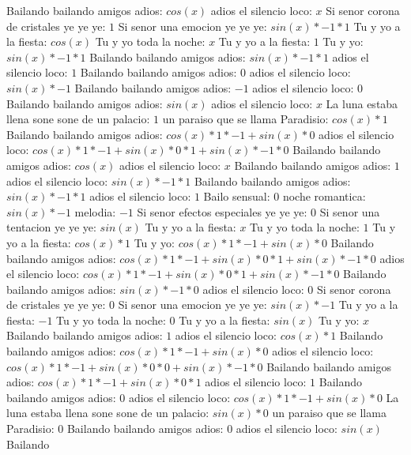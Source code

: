 \documentclass{article}
\begin{document}
Bailando bailando amigos adios: $cos(x)$  \newline adios el silencio loco: $x$ Si senor corona de cristales ye ye ye: $1$  \newline Si senor una emocion ye ye ye: $sin(x)*-1*1$ Tu y yo a la fiesta: $cos(x)$  \newline Tu y yo toda la noche: $x$ Tu y yo a la fiesta: $1$  \newline Tu y yo: $sin(x)*-1*1$ Bailando bailando amigos adios: $sin(x)*-1*1$ adios el silencio loco: $1$ Bailando bailando amigos adios: $0$  \newline adios el silencio loco: $sin(x)*-1$ Bailando bailando amigos adios: $-1$ adios el silencio loco: $0$  \newline Bailando bailando amigos adios: $sin(x)$  \newline adios el silencio loco: $x$ La luna estaba llena sone sone de un palacio: $1$  \newline un paraiso que se llama Paradisio: $cos(x)*1$ Bailando bailando amigos adios: $cos(x)*1*-1+sin(x)*0$ adios el silencio loco: ${cos(x)*1*-1+sin(x)*0}*1+sin(x)*-1*0$ Bailando bailando amigos adios: $cos(x)$  \newline adios el silencio loco: $x$ Bailando bailando amigos adios: $1$  \newline adios el silencio loco: $sin(x)*-1*1$ Bailando bailando amigos adios: $sin(x)*-1*1$ adios el silencio loco: $1$ Bailo sensual: $0$  \newline noche romantica: $sin(x)*-1$ melodia: $-1$ Si senor efectos especiales ye ye ye: $0$  \newline Si senor una tentacion ye ye ye: $sin(x)$  \newline Tu y yo a la fiesta: $x$ Tu y yo toda la noche: $1$  \newline Tu y yo a la fiesta: $cos(x)*1$ Tu y yo: $cos(x)*1*-1+sin(x)*0$ Bailando bailando amigos adios: ${cos(x)*1*-1+sin(x)*0}*1+sin(x)*-1*0$ adios el silencio loco: ${cos(x)*1*-1+sin(x)*0}*1+sin(x)*-1*0$  \newline Bailando bailando amigos adios: $sin(x)*-1*0$ adios el silencio loco: $0$ Si senor corona de cristales ye ye ye: $0$  \newline Si senor una emocion ye ye ye: $sin(x)*-1$ Tu y yo a la fiesta: $-1$ Tu y yo toda la noche: $0$  \newline Tu y yo a la fiesta: $sin(x)$  \newline Tu y yo: $x$ Bailando bailando amigos adios: $1$  \newline adios el silencio loco: $cos(x)*1$ Bailando bailando amigos adios: $cos(x)*1*-1+sin(x)*0$ adios el silencio loco: ${cos(x)*1*-1+sin(x)*0}*0+sin(x)*-1*0$ Bailando bailando amigos adios: ${cos(x)*1*-1+sin(x)*0}*1$ adios el silencio loco: $1$ Bailando bailando amigos adios: $0$  \newline adios el silencio loco: $cos(x)*1*-1+sin(x)*0$  \newline La luna estaba llena sone sone de un palacio: $sin(x)*0$ un paraiso que se llama Paradisio: $0$ Bailando bailando amigos adios: $0$  \newline adios el silencio loco: $sin(x)$  \newline Bailando 
\end{document}

